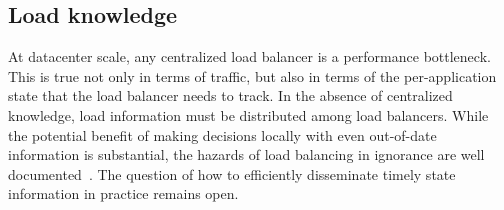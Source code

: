 

\subsection{Load knowledge}

At datacenter scale, any centralized load balancer is a performance
bottleneck.  This is true not only in terms of traffic, but also in
terms of the per-application state that the load balancer needs to
track. In the absence of centralized knowledge, load information must
be distributed among load balancers. While the potential benefit of
making decisions locally with even out-of-date information is
substantial, the hazards of load balancing in ignorance are well
documented~\cite{dahlin_stale_info,mitzenmacher_old_info}. The
question of how to efficiently disseminate timely state information in
practice remains open.

